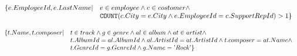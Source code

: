 \begin{exercise}{6}

\begin{subexercise}
  \begin{displaymath}
    \begin{array}{l l}
      \{ e.EmployeeId, e.LastName | & e \in employee \land c \in costomer \land\\
              & \text{\texttt{COUNT}}( c.City = e.City \land e.EmployeeId =
              c.SupportRepId ) > 1 \}
    \end{array}
  \end{displaymath}
\end{subexercise}

\begin{subexercise}
  \begin{displaymath}
    \begin{array}{l l}
      \{ t.Name, t.composer | &t \in track \land  g\in genre \land al\in album
      \land at \in artist \land \\
            & t.AlbumId = al.AlbumId \land al.ArtistId = at.ArtistId \land
                t.composer = at.Name \land \\
            & t.GenreId = g.GenreId \land g.Name = \text{'}Rock\text{'}
        \}
    \end{array}
  \end{displaymath}
\end{subexercise}
\end{exercise}
